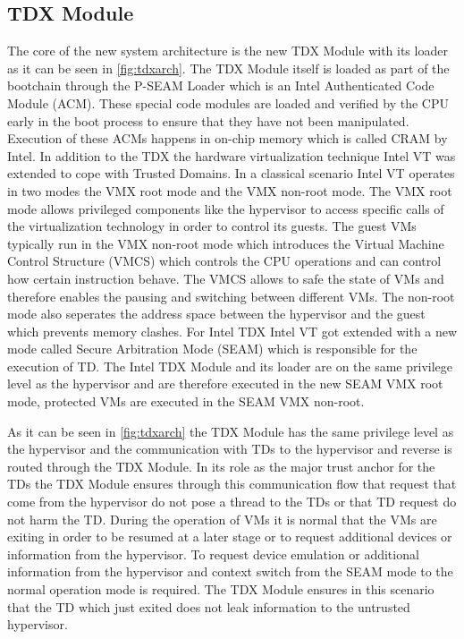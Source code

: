 \documentclass[sigplan,screen,nonacm]{acmart}
\begin{document}
\subsection{TDX Module}
The core of the new system architecture is the new TDX Module with its loader as it can be seen in \cref{fig:tdxarch}.
The TDX Module itself is loaded as part of the bootchain through the P-SEAM Loader which is an Intel Authenticated Code Module (ACM).
These special code modules are loaded and verified by the CPU early in the boot process to ensure that they have not been manipulated.
Execution of these ACMs happens in on-chip memory which is called CRAM by Intel.
In addition to the TDX the hardware virtualization technique Intel VT was extended to cope with Trusted Domains.
In a classical scenario Intel VT operates in two modes the VMX root mode and the VMX non-root mode.
The VMX root mode allows privileged components like the hypervisor to access specific calls of the virtualization technology in order to control its guests.
The guest VMs typically run in the VMX non-root mode which introduces the Virtual Machine Control Structure (VMCS) which controls the CPU operations and can control how certain instruction behave. The VMCS allows to safe the state of VMs and therefore enables the pausing and switching between different VMs.
The non-root mode also seperates the address space between the hypervisor and the guest which prevents memory clashes\cite{VTx}.
For Intel TDX Intel VT got extended with a new mode called Secure Arbitration Mode (SEAM) which is responsible for the execution of TD.
The Intel TDX Module  and its loader are on the same privilege level as the hypervisor and are therefore executed in the new SEAM VMX root mode, protected VMs are executed in the SEAM VMX non-root.

As it can be seen in \cref{fig:tdxarch} the TDX Module has the same privilege level as the hypervisor and the communication with TDs to the hypervisor and reverse is routed through the TDX Module.
In its role as the major trust anchor for the TDs the TDX Module ensures through this communication flow that request that come from the hypervisor do not pose a thread to the TDs or that TD request do not harm the TD.
During the operation of VMs it is normal that the VMs are exiting in order to be resumed at a later stage or to request additional devices or information from the hypervisor.
To request device emulation or additional information from the hypervisor and context switch from the SEAM mode to the normal operation mode is required.
The TDX Module ensures in this scenario that the TD which just exited does not leak information to the untrusted hypervisor.
\end{document}
